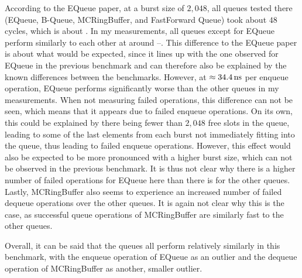 According to the EQueue paper, at a burst size of $2,048$, all queues tested there (EQueue, B-Queue,
MCRingBuffer, and FastForward Queue) took about $48$ cycles, which is about .
In my measurements, all queues except for EQueue perform similarly to each other at around --.
This difference to the EQueue paper is about what would be expected, since it lines up with the one observed
for EQueue in the previous benchmark and can therefore also be explained by the known differences between the
benchmarks.
However, at $\approx \SI{34.4}{\nano\second}$ per enqueue operation, EQueue performs significantly worse than the other
queues in my measurements.
When not measuring failed operations, this difference can not be seen, which means that it appears due to
failed enqueue operations.
On its own, this could be explained by there being fewer than $2,048$ free slots in the queue, leading to some
of the last elements from each burst not immediately fitting into the queue, thus leading to failed enqueue operations.
However, this effect would also be expected to be more pronounced with a higher burst size, which can
not be observed in the previous benchmark.
It is thus not clear why there is a higher number of failed operations for EQueue here than there is for the
other queues.
Lastly, MCRingBuffer also seems to experience an increased number of failed dequeue operations over the other queues.
It is again not clear why this is the case, as successful queue operations of MCRingBuffer are similarly fast
to the other queues.

Overall, it can be said that the queues all perform relatively similarly in this benchmark, with the enqueue
operation of EQueue as an outlier and the dequeue operation of MCRingBuffer as another, smaller outlier.

